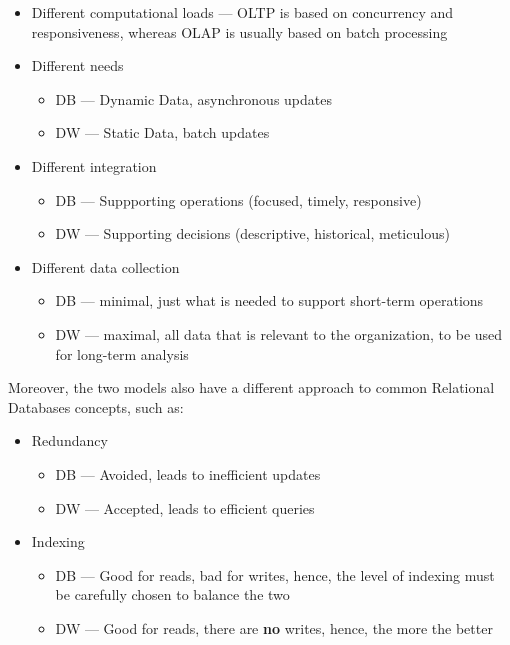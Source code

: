 \documentclass[openright, twoside, twocolumn, a4paper, 10pt]{report}
\begin{document}
\begin{itemize}
	\item Different computational loads --- OLTP is based on concurrency and responsiveness, whereas OLAP
	      is usually based on batch processing
	\item Different needs
	      \begin{itemize}
		      \item DB --- Dynamic Data, asynchronous updates
		      \item DW --- Static Data, batch updates
	      \end{itemize}
	\item Different integration
	      \begin{itemize}
		      \item DB --- Suppporting operations  (focused, timely, responsive)
		      \item DW --- Supporting decisions (descriptive, historical, meticulous)
	      \end{itemize}
	\item Different data collection
	      \begin{itemize}
		      \item DB --- minimal, just what is needed to support short-term operations
		      \item DW --- maximal, all data that is relevant to the organization, to be
		            used for long-term analysis
	      \end{itemize}
\end{itemize}

Moreover, the two models also have a different approach to common Relational Databases
concepts, such as:

\begin{itemize}
	\item Redundancy
	      \begin{itemize}
		      \item DB --- Avoided, leads to inefficient updates
		      \item DW --- Accepted, leads to efficient queries
	      \end{itemize}
	\item Indexing
	      \begin{itemize}
		      \item DB --- Good for reads, bad for writes, hence, the level of indexing
		            must be carefully chosen to balance the two
		      \item DW --- Good for reads, there are \textbf{no} writes, hence, the more the better
	      \end{itemize}
\end{itemize}
\end{document}
